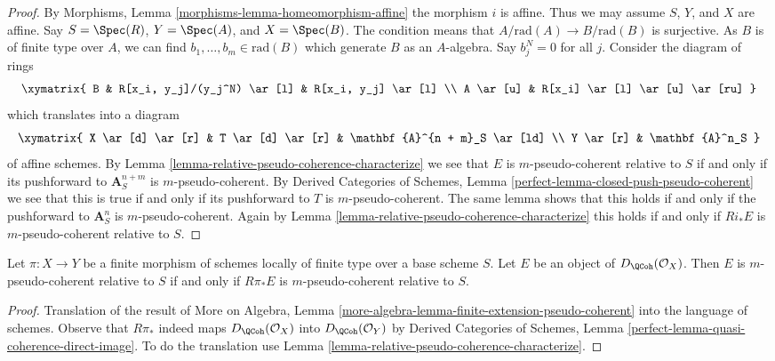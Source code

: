 \begin{proof}
By Morphisms, Lemma \ref{morphisms-lemma-homeomorphism-affine}
the morphism $i$ is affine. Thus we may assume $S$, $Y$, and $X$ are affine.
Say $S = \Spec(R)$, $Y = \Spec(A)$, and $X = \Spec(B)$.
The condition means that $A/\text{rad}(A) \to B/\text{rad}(B)$ is
surjective. As $B$ is of finite type over $A$, we can find
$b_1, \ldots, b_m \in \text{rad}(B)$ which generate $B$ as an
$A$-algebra. Say $b_j^N = 0$ for all $j$. Consider the diagram of
rings
$$
\xymatrix{
B & R[x_i, y_j]/(y_j^N) \ar[l] & R[x_i, y_j] \ar[l] \\
A \ar[u] & R[x_i] \ar[l] \ar[u] \ar[ru]
}
$$
which translates into a diagram
$$
\xymatrix{
X \ar[d] \ar[r] & T \ar[d] \ar[r] & \mathbf{A}^{n + m}_S \ar[ld] \\
Y \ar[r] & \mathbf{A}^n_S
}
$$
of affine schemes. By Lemma \ref{lemma-relative-pseudo-coherence-characterize}
we see that $E$ is $m$-pseudo-coherent relative to $S$ if and only if its
pushforward to $\mathbf{A}^{n + m}_S$ is $m$-pseudo-coherent. 
By Derived Categories of Schemes, Lemma
\ref{perfect-lemma-closed-push-pseudo-coherent}
we see that this is true if and only if its pushforward to $T$ is
$m$-pseudo-coherent. The same lemma shows that this holds if and only
if the pushforward to $\mathbf{A}^n_S$ is $m$-pseudo-coherent.
Again by
Lemma \ref{lemma-relative-pseudo-coherence-characterize}
this holds if and only if $Ri_*E$ is $m$-pseudo-coherent relative to $S$.
\end{proof}

\begin{lemma}
\label{lemma-finite-morphism-relative-pseudo-coherence}
Let $\pi : X \to Y$ be a finite morphism of schemes locally of finite
type over a base scheme $S$. Let $E$ be an object of
$D_\QCoh(\mathcal{O}_X)$. Then $E$ is $m$-pseudo-coherent
relative to $S$ if and only if $R\pi_*E$ is $m$-pseudo-coherent
relative to $S$.
\end{lemma}

\begin{proof}
Translation of the result of
More on Algebra, Lemma
\ref{more-algebra-lemma-finite-extension-pseudo-coherent}
into the language of schemes. Observe that $R\pi_*$ indeed
maps $D_\QCoh(\mathcal{O}_X)$ into $D_\QCoh(\mathcal{O}_Y)$
by Derived Categories of Schemes, Lemma
\ref{perfect-lemma-quasi-coherence-direct-image}.
To do the translation use
Lemma \ref{lemma-relative-pseudo-coherence-characterize}.
\end{proof}

